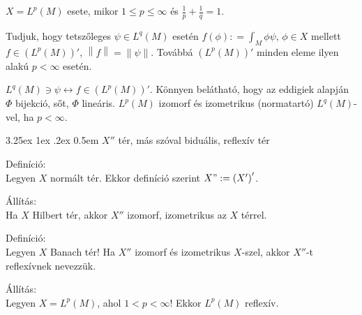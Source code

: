 \documentclass[12pt,a4paper]{scrartcl}
\makeatletter
\renewcommand\paragraph{\@startsection{paragraph}{4}{\z@}%
                                    {3.25ex \@plus1ex \@minus.2ex}%
                                    {0.5em} %
                                    {\normalfont\normalsize\bfseries}}
\newenvironment{definicio}{}{}
\newenvironment{allitas}{}{}
\makeatother
\begin{document}
\(X = L^{p}\left( M \right)\) esete, mikor \(1 \leq p \leq \infty\) és
\(\frac{1}{p} + \frac{1}{q} = 1\).

Tudjuk, hogy tetszőleges \(\psi \in L^{q}\left( M \right)\) esetén
\(f\left( \phi \right): = {\int_{M}{\phi\psi}}\), \(\phi \in X\) mellett
\(f \in \left( {L^{p}\left( M \right)} \right)'\),
\(\left\| f \right\| = \left\| \psi \right\|\). Továbbá
\(\left( {L^{p}\left( M \right)} \right)'\) minden eleme ilyen alakú
\(p < \infty\) esetén.

\(\left. L^{q}\left( M \right) \ni \psi\leftrightarrow f \in \left( {L^{p}\left( M \right)} \right)' \right.\).
Könnyen belátható, hogy az eddigiek alapján \(\Phi\) bijekció, sőt,
\(\Phi\) lineáris. \(L^{p}\left( M \right)\) izomorf és izometrikus
(normatartó) \(L^{q}\left( M \right)\)-vel, ha \(p < \infty\).

\hypertarget{x-ter-mas-szoval-bidualis-reflexiv-ter}{%
\paragraph{\texorpdfstring{\(X''\) tér, más szóval biduális, reflexív
tér}{X'' tér, más szóval biduális, reflexív tér}}\label{x-ter-mas-szoval-bidualis-reflexiv-ter}}

\begin{definicio}

Definíció:\\
Legyen \(X\) normált tér. Ekkor definíció szerint
\(X": = \left( {X'} \right)'\).

\end{definicio}

\begin{allitas}

Állítás:\\
Ha \(X\) Hilbert tér, akkor \(X''\) izomorf, izometrikus az \(X\)
térrel.

\end{allitas}

\begin{definicio}

Definíció:\\
Legyen \(X\) Banach tér! Ha \(X''\) izomorf és izometrikus \(X\)-szel,
akkor \(X''\)-t reflexívnek nevezzük.

\end{definicio}

\begin{allitas}

Állítás:\\
Legyen \(X = L^{p}\left( M \right)\), ahol \(1 < p < \infty\)! Ekkor
\(L^{p}\left( M \right)\) reflexív.

\end{allitas}
\end{document}
